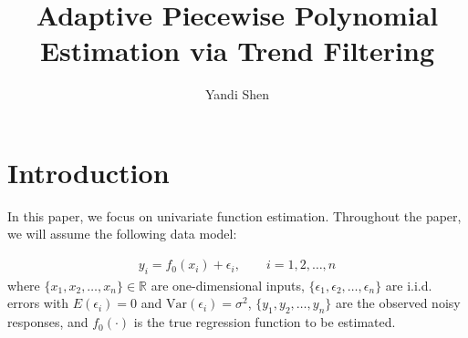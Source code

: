 \documentclass[a4paper]{article}
\title{Adaptive Piecewise Polynomial Estimation via Trend Filtering}
\author{Yandi Shen}
\newcommand{\RR}{\mathbb{R}}
\begin{document}
\maketitle


\section{Introduction}
\label{sec:intro}
In this paper, we focus on univariate function estimation. Throughout the paper, we will assume the following data model:

\begin{align}
y_i = f_0(x_i) + \epsilon_i, \qquad i = 1, 2, \ldots, n \label{eq:nonpara_model}
\end{align}
where $\{x_1, x_2, \ldots, x_n\}\in\RR$ are one-dimensional inputs, $\{\epsilon_1, \epsilon_2, \ldots, \epsilon_n\}$ are i.i.d. errors with $E(\epsilon_i) = 0$ and $\mbox{Var}(\epsilon_i) = \sigma^2$, $\{y_1, y_2, \ldots, y_n\}$ are the observed noisy responses, and $f_0(\cdot)$ is the true regression function to be estimated. 
\end{document}
